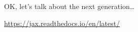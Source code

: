 \begin{frame}
    
    OK, let's talk about the next generation\ldots

\end{frame}


\begin{frame}

    \begin{figure}
       \centering
    \end{figure}
    
            \vspace{0.5em}

    \begin{center}
        \url{https://jax.readthedocs.io/en/latest/}
    \end{center}

\end{frame}

